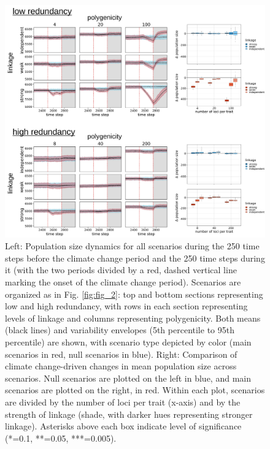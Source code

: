 \documentclass[9pt,twocolumn,twoside,lineno]{pnas-new}
\begin{document}
\begin{figure}[\sidecaptionrelwidth][t]
\centering
\includegraphics[width=17.8cm]{pub/figs_and_stats/FIG_S2_Nt_over_time.jpg}
\caption{Left: Population size dynamics for all scenarios during the 250 time steps before the climate change period and the 250 time steps during it (with the two periods divided by a red, dashed vertical line marking the onset of the climate change period). Scenarios are organized as in Fig. \ref{fig:fig_2}: top and bottom sections representing low and high redundancy, with rows in each section representing levels of linkage and columns representing polygenicity. Both means (black lines) and variability envelopes (5th percentile to 95th percentile) are shown, with scenario type depicted by color (main scenarios in red, null scenarios in blue). Right: Comparison of climate change-driven changes in mean population size across scenarios. Null scenarios are plotted on the left in blue, and main scenarios are plotted on the right, in red. Within each plot, scenarios are divided by the number of loci per trait (x-axis) and by the strength of linkage (shade, with darker hues representing stronger linkage). Asterisks above each box indicate level of significance (*=0.1, **=0.05, ***=0.005).}
\label{fig:fig_s2}
\end{figure}
\end{document}

